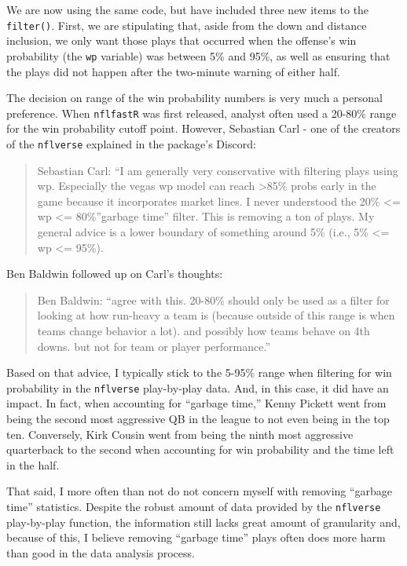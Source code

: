 \documentclass[
  letterpaper,
]{krantz}
\begin{document}
We are now using the same code, but have included three new items to the
\texttt{filter()}. First, we are stipulating that, aside from the down
and distance inclusion, we only want those plays that occurred when the
offense's win probability (the \texttt{wp} variable) was between 5\% and
95\%, as well as ensuring that the plays did not happen after the
two-minute warning of either half.

The decision on range of the win probability numbers is very much a
personal preference. When \texttt{nflfastR} was first released, analyst
often used a 20-80\% range for the win probability cutoff point.
However, Sebastian Carl - one of the creators of the \texttt{nflverse}
explained in the package's Discord:

\begin{quote}
Sebastian Carl: ``I am generally very conservative with filtering plays
using wp. Especially the vegas wp model can reach \textgreater85\% probs
early in the game because it incorporates market lines. I never
understood the 20\% \textless= wp \textless= 80\%''garbage time''
filter. This is removing a ton of plays. My general advice is a lower
boundary of something around 5\% (i.e., 5\% \textless= wp \textless=
95\%).
\end{quote}

Ben Baldwin followed up on Carl's thoughts:

\begin{quote}
Ben Baldwin: ``agree with this. 20-80\% should only be used as a filter
for looking at how run-heavy a team is (because outside of this range is
when teams change behavior a lot). and possibly how teams behave on 4th
downs. but not for team or player performance.''
\end{quote}

Based on that advice, I typically stick to the 5-95\% range when
filtering for win probability in the \texttt{nflverse} play-by-play
data. And, in this case, it did have an impact. In fact, when accounting
for ``garbage time,'' Kenny Pickett went from being the second most
aggressive QB in the league to not even being in the top ten.
Conversely, Kirk Cousin went from being the ninth most aggressive
quarterback to the second when accounting for win probability and the
time left in the half.

That said, I more often than not do not concern myself with removing
``garbage time'' statistics. Despite the robust amount of data provided
by the \texttt{nflverse} play-by-play function, the information still
lacks great amount of granularity and, because of this, I believe
removing ``garbage time'' plays often does more harm than good in the
data analysis process.
\end{document}
